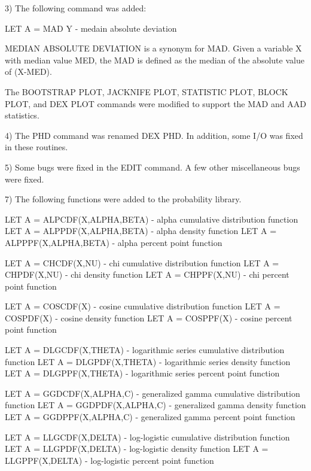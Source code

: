{ 3) The following command was added:
   
       LET A = MAD Y          - medain absolute deviation

    MEDIAN ABSOLUTE DEVIATION is a synonym for MAD.  Given a variable
    X with median value MED, the MAD is defined as the median of
    the absolute value of (X-MED).

    The BOOTSTRAP PLOT, JACKNIFE PLOT, STATISTIC PLOT, BLOCK PLOT, and
    DEX PLOT commands were modified to support the MAD and AAD
    statistics.

 4) The PHD command was renamed DEX PHD.  In addition, some I/O was
    fixed in these routines.

 5) Some bugs were fixed in the EDIT command.  A few other
    miscellaneous bugs were fixed.

 7) The following functions were added to the probability library.

      LET A = ALPCDF(X,ALPHA,BETA)  - alpha cumulative distribution
                                      function
      LET A = ALPPDF(X,ALPHA,BETA)  - alpha density function
      LET A = ALPPPF(X,ALPHA,BETA)  - alpha percent point function

      LET A = CHCDF(X,NU)           - chi cumulative distribution
                                      function
      LET A = CHPDF(X,NU)           - chi density function
      LET A = CHPPF(X,NU)           - chi percent point function

      LET A = COSCDF(X)             - cosine cumulative distribution
                                      function
      LET A = COSPDF(X)             - cosine density function
      LET A = COSPPF(X)             - cosine percent point function

      LET A = DLGCDF(X,THETA)       - logarithmic series cumulative
                                      distribution function
      LET A = DLGPDF(X,THETA)       - logarithmic series density
                                      function
      LET A = DLGPPF(X,THETA)       - logarithmic series percent point
                                      function

      LET A = GGDCDF(X,ALPHA,C)     - generalized gamma cumulative
                                      distribution function
      LET A = GGDPDF(X,ALPHA,C)     - generalized gamma density function
      LET A = GGDPPF(X,ALPHA,C)     - generalized gamma percent point
                                      function

      LET A = LLGCDF(X,DELTA)       - log-logistic cumulative
                                      distribution function
      LET A = LLGPDF(X,DELTA)       - log-logistic density function
      LET A = LLGPPF(X,DELTA)       - log-logistic percent point
                                      function

}
